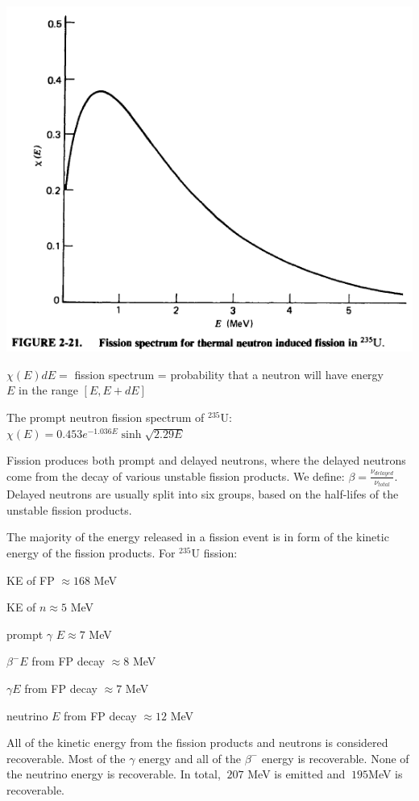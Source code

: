 \documentclass[12pt]{article}
\begin{document}
\begin{center}
\includegraphics[scale=0.6]{../figs/fissionspectrum}
\end{center}
$\chi(E)dE=$ fission spectrum = probability that a neutron will have energy\\ $E$ in the range $[E, E+dE]$

The prompt neutron fission spectrum of $^{235}$U: $\chi(E) = 0.453 e^{-1.036E}\sinh\sqrt{2.29E}$

Fission produces both prompt and delayed neutrons, where the delayed neutrons come from the decay of various unstable fission products. We define: $\beta=\frac{\nu_{delayed}}{\nu_{total}}$. Delayed neutrons are usually split into six groups, based on the half-lifes of the unstable fission products.

The majority of the energy released in a fission event is in form of the kinetic energy of the fission products. For $^{235}$U fission:

KE of FP $\approx 168$ MeV

KE of $n\approx 5$ MeV

prompt $\gamma$ $E\approx 7$ MeV

$\beta^- E$ from FP decay $\approx 8$ MeV

$\gamma E$ from FP decay $\approx 7$ MeV

neutrino $E$ from FP decay $\approx 12$ MeV

All of the kinetic energy from the fission products and neutrons is considered recoverable. Most of the $\gamma$ energy and all of the $\beta^-$ energy is recoverable. None of the neutrino energy is recoverable. In total, $~207$ MeV is emitted and $~195$MeV is recoverable.
\end{document}
